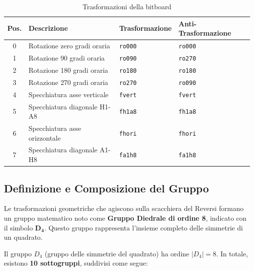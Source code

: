 \begin{table}[h]
\centering
\caption{Trasformazioni della bitboard}
\label{tab:bitboard_transformations}
\begin{tabular}{|c|l|l|l|}
\hline
\textbf{Pos.} & \textbf{Descrizione} & \textbf{Trasformazione} & \textbf{Anti-Trasformazione} \\ \hline
0 & Rotazione zero gradi oraria  & \texttt{ro000} & \texttt{ro000} \\ \hline
1 & Rotazione 90 gradi oraria    & \texttt{ro090} & \texttt{ro270} \\ \hline
2 & Rotazione 180 gradi oraria   & \texttt{ro180} & \texttt{ro180} \\ \hline
3 & Rotazione 270 gradi oraria   & \texttt{ro270} & \texttt{ro090} \\ \hline
4 & Specchiatura asse verticale  & \texttt{fvert} & \texttt{fvert} \\ \hline
5 & Specchiatura diagonale H1-A8 & \texttt{fh1a8} & \texttt{fh1a8} \\ \hline
6 & Specchiatura asse orizzontale & \texttt{fhori} & \texttt{fhori} \\ \hline
7 & Specchiatura diagonale A1-H8 & \texttt{fa1h8} & \texttt{fa1h8} \\ \hline
\end{tabular}
\end{table}

\subsection{Definizione e Composizione del Gruppo}
\label{sec:gruppo_diedrale}

Le trasformazioni geometriche che agiscono sulla scacchiera del Reversi formano un gruppo matematico
noto come \textbf{Gruppo Diedrale di ordine 8}, indicato con il simbolo $\bm{D_4}$.
Questo gruppo rappresenta l'insieme completo delle simmetrie di un quadrato.

Il gruppo $D_4$ (gruppo delle simmetrie del quadrato) ha ordine $|D_4| = 8$. In totale, esistono \textbf{10 sottogruppi}, suddivisi come segue:

